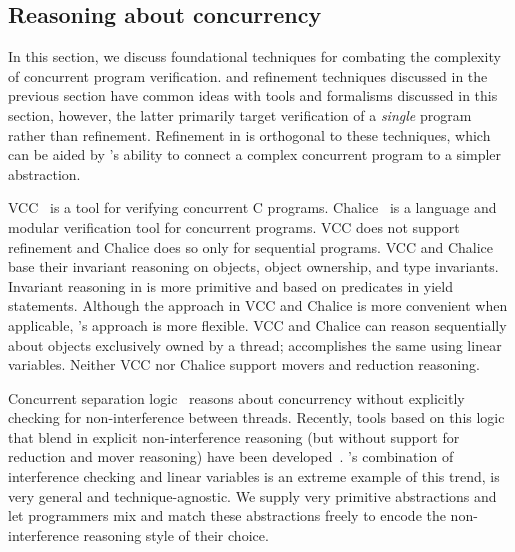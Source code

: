 \subsection{Reasoning about concurrency}
In this section, we discuss foundational techniques
for combating the complexity of concurrent program verification. 
\civl and refinement techniques discussed in the previous
section have common ideas with tools and formalisms
discussed in this section, however, the latter primarily target verification of a {\em single} program rather than refinement. 
Refinement in \civl is orthogonal to these techniques, which can be aided by \civl's 
ability to connect a complex concurrent program to a simpler abstraction.

VCC~\cite{VCC} is a tool for verifying concurrent C programs.  
Chalice~\cite{LM09} is a language and modular verification tool for concurrent programs. 
VCC does not support refinement and Chalice does so only for sequential programs.  
VCC and Chalice base their invariant reasoning on objects, object ownership, and type invariants. 
Invariant reasoning in \civl is more primitive and based on predicates in yield statements. 
Although the approach in VCC and Chalice is more convenient when applicable, \civl's approach is more flexible. 
VCC and Chalice can reason sequentially about objects exclusively owned by a thread;
\civl accomplishes the same using linear variables.
Neither VCC nor Chalice support movers and reduction reasoning.

Concurrent separation logic~\cite{OHearn07} reasons about concurrency without 
explicitly checking for non-interference between threads. 
Recently, tools based on this logic that blend in explicit
non-interference reasoning (but without support for reduction and mover reasoning) have been developed~\cite{SAGL,RGSep}. 
\civl's combination of interference checking and linear variables is
an extreme example of this trend, is very general and technique-agnostic. 
We supply very primitive abstractions and let programmers mix and
match these abstractions freely to encode the non-interference reasoning style of their choice. 



